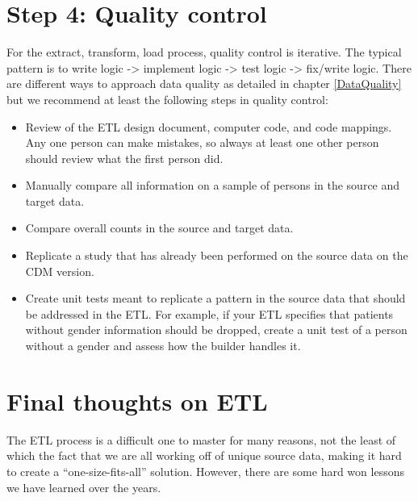 \documentclass[11pt]{book}
\providecommand{\tightlist}{%
  \setlength{\itemsep}{0pt}\setlength{\parskip}{0pt}}
\theoremstyle{definition}
\theoremstyle{definition}
\theoremstyle{definition}
\theoremstyle{remark}
\begin{document}
\hypertarget{step-4-quality-control}{%
\section{Step 4: Quality control}\label{step-4-quality-control}}

For the extract, transform, load process, quality control is iterative. The typical pattern is to write logic -\textgreater{} implement logic -\textgreater{} test logic -\textgreater{} fix/write logic. There are different ways to approach data quality as detailed in chapter \ref{DataQuality} but we recommend at least the following steps in quality control:

\begin{itemize}
\tightlist
\item
  Review of the ETL design document, computer code, and code mappings. Any one person can make mistakes, so always at least one other person should review what the first person did.
\item
  Manually compare all information on a sample of persons in the source and target data.
\item
  Compare overall counts in the source and target data.
\item
  Replicate a study that has already been performed on the source data on the CDM version.
\item
  Create unit tests meant to replicate a pattern in the source data that should be addressed in the ETL. For example, if your ETL specifies that patients without gender information should be dropped, create a unit test of a person without a gender and assess how the builder handles it.
\end{itemize}

\hypertarget{final-thoughts-on-etl}{%
\section{Final thoughts on ETL}\label{final-thoughts-on-etl}}

The ETL process is a difficult one to master for many reasons, not the least of which the fact that we are all working off of unique source data, making it hard to create a ``one-size-fits-all'' solution. However, there are some hard won lessons we have learned over the years.
\end{document}

